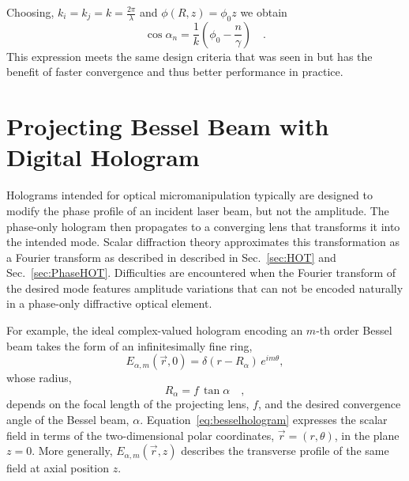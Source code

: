 Choosing, $k_i = k_j = k = \frac{2 \pi}{\lambda}$ and $\phi (R,z) = \phi _0 z$ we obtain 
\begin{equation}\label{Eq: cos alpha}
\cos\alpha _n = \frac{1}{k}(\phi _0 - \frac{n}{\gamma}) \quad .
\end{equation}
This expression meets the same design criteria that was seen in \cite{lee10} but has the benefit of faster convergence and thus better performance in practice.

\section{Projecting Bessel Beam with \\ Digital Hologram}
\label{sec:Project Bessel Hologram}

Holograms intended for optical micromanipulation typically are designed to modify the phase profile of an incident laser beam, but not the amplitude. The phase-only hologram then propagates to a converging lens that transforms it into the intended mode. Scalar diffraction theory approximates this transformation as a Fourier transform \cite{goodman05} as described in described in Sec.~\ref{sec:HOT} and Sec.~\ref{sec:PhaseHOT}. Difficulties are encountered when the Fourier transform of the desired mode features amplitude variations that can not be encoded naturally in a phase-only diffractive optical element.

For example, the ideal complex-valued hologram encoding 
an $m$-th order Bessel beam takes the form of an infinitesimally fine ring,
\begin{equation}
  \label{eq:besselhologram}
  E_{\alpha,m}(\vec{r},0)
  =
  \delta(r - R_\alpha) \, e^{i m\theta},
\end{equation}
whose radius, 
\begin{equation}
\label{eq:Ralpha}
R_{\alpha} = f \, \tan \alpha \quad ,
\end{equation}
depends on the focal length of the projecting lens, $f$, and the desired convergence angle of the Bessel beam, $\alpha$. 
Equation~\eqref{eq:besselhologram} expresses the
scalar field in terms of the two-dimensional
polar coordinates, $\vec{r} = (r,\theta)$, in the plane $z = 0$.
More generally, $E_{\alpha,m}(\vec{r},z)$ describes the
transverse profile of the same field at axial position $z$.

